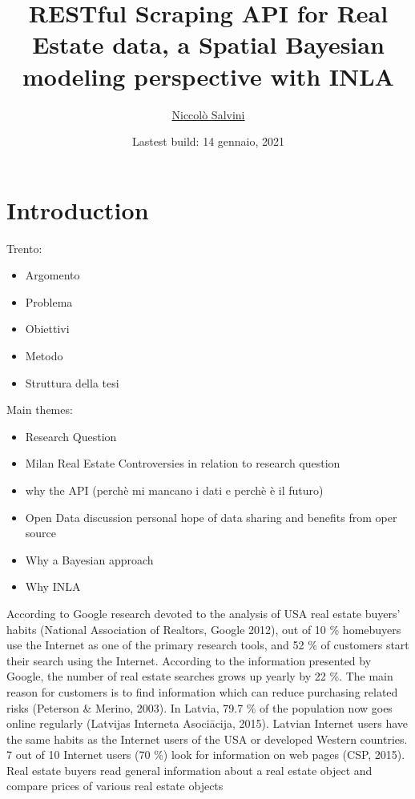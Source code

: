 \documentclass[
  12pt,
  a4paper,
  oneside]{book}
\title{RESTful Scraping API for Real Estate data, a Spatial Bayesian modeling perspective with INLA}
\author{\href{https://niccolosalvini.netlify.app/}{Niccolò Salvini}}
\date{Lastest build: 14 gennaio, 2021}
\providecommand{\tightlist}{%
  \setlength{\itemsep}{0pt}\setlength{\parskip}{0pt}}
\let\oldmaketitle\maketitle
\theoremstyle{definition}
\theoremstyle{definition}
\theoremstyle{definition}
\theoremstyle{remark}
\begin{document}
\maketitle


\newpage

\let\maketitle\oldmaketitle
\maketitle

{
\setcounter{tocdepth}{2}
\tableofcontents
}
\listoftables
\listoffigures
{}
\hypertarget{intro}{%
\chapter{Introduction}\label{intro}}

Trento:

\begin{itemize}
\tightlist
\item
  Argomento
\item
  Problema
\item
  Obiettivi
\item
  Metodo
\item
  Struttura della tesi
\end{itemize}

Main themes:

\begin{itemize}
\tightlist
\item
  Research Question
\item
  Milan Real Estate Controversies in relation to research question
\item
  why the API (perchè mi mancano i dati e perchè è il futuro)
\item
  Open Data discussion personal hope of data sharing and benefits from oper source
\item
  Why a Bayesian approach
\item
  Why INLA
\end{itemize}

According to Google research devoted to the analysis of USA real estate
buyers' habits (National Association of Realtors, Google 2012), out of 10 \%
homebuyers use the Internet as one of the primary research tools, and 52 \% of
customers start their search using the Internet. According to the information
presented by Google, the number of real estate searches grows up yearly by 22 \%.
The main reason for customers is to find information which can reduce purchasing
related risks (Peterson \& Merino, 2003).
In Latvia, 79.7 \% of the population now goes online regularly (Latvijas
Interneta Asociācija, 2015). Latvian Internet users have the same habits as the
Internet users of the USA or developed Western countries. 7 out of 10 Internet
users (70 \%) look for information on web pages (CSP, 2015). Real estate buyers
read general information about a real estate object and compare prices of various
real estate objects
\end{document}
